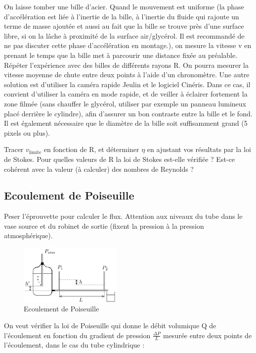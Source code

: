 \documentclass{article}%
\begin{document}
On laisse tomber une bille d'acier. Quand le mouvement est uniforme (la phase d'accélération est liée à l'inertie de la bille, à l'inertie du fluide qui rajoute un terme de masse ajoutée et aussi au fait que la bille se trouve près d'une surface libre, si on la lâche à proximité de la surface air/glycérol. Il est recommandé de ne pas discuter cette phase d'accélération en montage.), on mesure la vitesse v en prenant le temps que la bille met à parcourir une distance fixée au préalable. Répéter l'expérience avec des billes de différents rayons R. On pourra mesurer la vitesse moyenne de chute entre deux points à l'aide d'un chronomètre. Une autre solution est d'utiliser la caméra rapide Jeulin et le logiciel Cinéris. Dans ce cas, il convient d'utiliser la caméra en mode rapide, et de veiller à éclairer fortement la zone filmée (sans chauffer le glycérol, utiliser par exemple un panneau lumineux placé derrière le cylindre), afin d'assurer un bon contraste entre la bille et le fond. Il est également nécessaire que le diamètre de la bille soit suffisamment grand (5 pixels ou plus).

Tracer $v_{\textrm{limite}}$ en fonction de R, et déterminer $\eta$ en ajustant vos résultats par la loi de Stokes. Pour quelles valeurs de R la loi de Stokes est-elle vérifiée ? Est-ce cohérent avec la valeur (à calculer) des nombres de Reynolds ?

\subsection{Ecoulement de Poiseuille}
Peser l'éprouvette pour calculer le flux. Attention aux niveaux du tube dans le vase source et du robinet de sortie (fixent la pression à la pression atmosphérique).

\begin{figure}
	\centerline{\includegraphics[width=5cm]{images-exp/EcoulementPoiseuille.png}}
 \caption{Ecoulement de Poiseuille}
\end{figure}
On veut vérifier la loi de Poiseuille qui donne le débit volumique Q de l'écoulement en fonction du gradient de pression $\frac{\Delta P}{L}$ mesurée entre deux points de l'écoulement, dans le cas du tube cylindrique :
\end{document}
